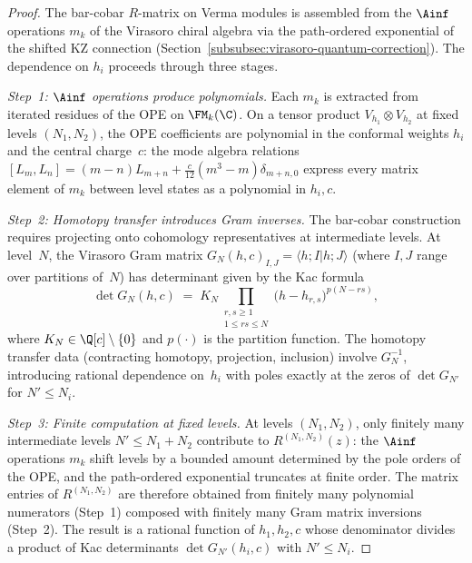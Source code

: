 \begin{proof}
The bar-cobar $R$-matrix on Verma modules is assembled from
the $\Ainf$ operations $m_k$ of the Virasoro chiral algebra
via the path-ordered exponential of the shifted KZ
connection (Section~\ref{subsubsec:virasoro-quantum-correction}).
The dependence on $h_i$ proceeds through three stages.

\emph{Step~1: $\Ainf$ operations produce polynomials.}
Each $m_k$ is extracted from iterated residues of the OPE
on $\FM_k(\C)$. On a tensor product
$V_{h_1} \otimes V_{h_2}$ at fixed levels
$(N_1, N_2)$, the OPE coefficients are polynomial in the
conformal weights $h_i$ and the central charge~$c$:
the mode algebra relations
$[L_m, L_n] = (m-n)L_{m+n} + \frac{c}{12}(m^3-m)\delta_{m+n,0}$
express every matrix element of $m_k$ between level states
as a polynomial in $h_i, c$.

\emph{Step~2: Homotopy transfer introduces Gram inverses.}
The bar-cobar construction requires projecting onto
cohomology representatives at intermediate levels. At
level~$N$, the Virasoro Gram matrix
$G_N(h,c)_{I,J} = \langle h; I | h; J \rangle$
(where $I, J$ range over partitions of~$N$) has
determinant given by the Kac formula
\[
 \det G_N(h,c)
 \;=\;
 K_N \prod_{\substack{r,s \ge 1 \\ 1 \le rs \le N}}
 \bigl(h - h_{r,s}\bigr)^{p(N - rs)},
\]
where $K_N \in \Q[c] \setminus \{0\}$ and $p(\cdot)$
is the partition function.
The homotopy transfer data (contracting homotopy,
projection, inclusion) involve $G_N^{-1}$, introducing
rational dependence on~$h_i$ with poles exactly at the
zeros of $\det G_{N'}$ for $N' \le N_i$.

\emph{Step~3: Finite computation at fixed levels.}
At levels $(N_1, N_2)$, only finitely many intermediate
levels $N' \le N_1 + N_2$ contribute to
$R^{(N_1,N_2)}(z)$: the $\Ainf$ operations $m_k$
shift levels by a bounded amount determined by the
pole orders of the OPE, and the path-ordered exponential
truncates at finite order.
The matrix entries of $R^{(N_1,N_2)}$ are therefore
obtained from finitely many polynomial numerators
(Step~1) composed with finitely many Gram matrix
inversions (Step~2). The result is a rational function
of $h_1, h_2, c$ whose denominator divides a product
of Kac determinants $\det G_{N'}(h_i, c)$ with
$N' \le N_i$.
\end{proof}

